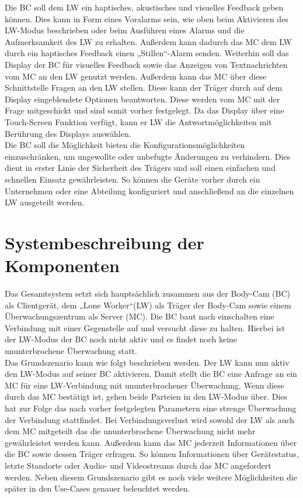 \documentclass[thesis.tex]{subfiles}
\begin{document}
Die BC soll dem LW ein haptisches, akustisches und visuelles Feedback geben können.
Dies kann in Form eines Voralarms sein, wie oben beim Aktivieren des LW-Modus beschrieben oder beim Ausführen eines Alarms
und die Aufmerksamkeit des LW zu erhalten.
Außerdem kann dadurch das MC dem LW durch ein haptisches Feedback einen „Stillen“-Alarm senden.
Weiterhin soll das Display der BC für visuelles Feedback sowie das Anzeigen von Textnachrichten vom MC an den LW genutzt werden.
Außerdem kann das MC über diese Schnittstelle Fragen an den LW stellen.
Diese kann der Träger durch auf dem Display eingeblendete Optionen beantworten.
Diese werden vom MC mit der Frage mitgeschickt und sind somit vorher festgelegt.
Da das Display über eine Touch-Screen Funktion verfügt, kann er LW die Antwortmöglichkeiten mit Berührung des Displays auswählen.
\\

Die BC soll die Möglichkeit bieten die Konfigurationsmöglichkeiten einzuschränken, um ungewollte oder unbefugte Änderungen zu verhindern.
Dies dient in erster Linie der Sicherheit des Trägers und soll einen einfachen und schnellen Einsatz gewährleisten.
So können die Geräte vorher durch ein Unternehmen oder eine Abteilung konfiguriert und anschließend an die einzelnen LW ausgeteilt werden.
\\


\section{Systembeschreibung der Komponenten} \label{bib:goals}
Das Gesamtsystem setzt sich hauptsächlich zusammen aus der Body-Cam (BC) als Clientgerät, dem „Lone Worker“(LW)
als Träger der Body-Cam sowie einem Überwachungszentrum als Server (MC).
Die BC baut nach einschalten eine Verbindung mit einer Gegenstelle auf und versucht diese zu halten.
Hierbei ist der LW-Modus der BC noch nicht aktiv und es findet noch keine ununterbrochene Überwachung statt.
\\

Das Grundszenario kann wie folgt beschrieben werden. Der LW kann nun aktiv den LW-Modus auf seiner BC aktivieren.
Damit stellt die BC eine Anfrage an ein MC für eine LW-Verbindung mit ununterbrochener Überwachung.
Wenn diese durch das MC bestätigt ist, gehen beide Parteien in den LW-Modus über.
Dies hat zur Folge das nach vorher festgelegten Parametern eine strenge Überwachung der Verbindung stattfindet.
Bei Verbindungsverlust wird sowohl der LW als auch dem MC mitgeteilt das die ununterbrochene Überwachung nicht mehr gewährleistet werden kann.
Außerdem kann das MC jederzeit Informationen über die BC sowie dessen Träger erfragen.
So können Informationen über Gerätestatus, letzte Standorte oder Audio- und Videostreams durch das MC angefordert werden.
Neben diesem Grundszenario gibt es noch viele weitere Möglichkeiten die später in den Use-Cases genauer beleuchtet werden.
\\
\end{document}
